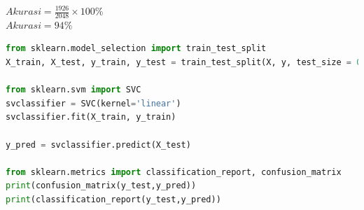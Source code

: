 \begin{enumerate} [1.]
	      \begin{center}
		      $Akurasi = \frac{1926}{2048}\times100\%$\\
		      $Akurasi = 94\%$
	      \end{center}


	      \begin{lstlisting}[label=classifier,language=Python]
from sklearn.model_selection import train_test_split
X_train, X_test, y_train, y_test = train_test_split(X, y, test_size = 0.20)

from sklearn.svm import SVC
svclassifier = SVC(kernel='linear')
svclassifier.fit(X_train, y_train)

y_pred = svclassifier.predict(X_test)

from sklearn.metrics import classification_report, confusion_matrix
print(confusion_matrix(y_test,y_pred))
print(classification_report(y_test,y_pred))
\end{lstlisting}
\end{enumerate}

